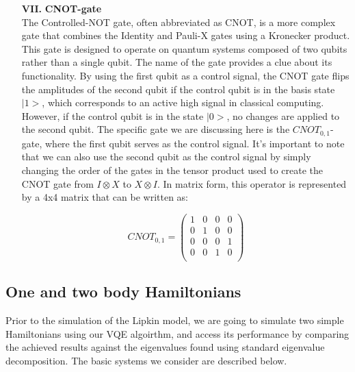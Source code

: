 \documentclass[onecolumn,10pt,cleanfoot]{asme2ej}
\begin{document}
\begin{enumerate}
	\item[\textbf{VII.}] \textbf{CNOT-gate} \\
		The Controlled-NOT gate, often abbreviated as CNOT, is a more complex gate that combines the Identity and Pauli-X gates using a Kronecker product. This gate is designed to operate on quantum systems composed of two qubits rather than a single qubit. The name of the gate provides a clue about its functionality. By using the first qubit as a control signal, the CNOT gate flips the amplitudes of the second qubit if the control qubit is in the basis state $|1>$, which corresponds to an active high signal in classical computing. However, if the control qubit is in the state $|0>$, no changes are applied to the second qubit. The specific gate we are discussing here is the $CNOT_{0,1}$-gate, where the first qubit serves as the control signal.
		It's important to note that we can also use the second qubit as the control signal by simply changing the order of the gates in the tensor product used to create the CNOT gate from $I \otimes X$ to $X \otimes I$. In matrix form, this operator is represented by a 4x4 matrix that can be written as:
		
		\begin{equation*}
		 CNOT_{0,1} = \begin{pmatrix}
			1 & 0 & 0 & 0 \\
			0 & 1 & 0 & 0 \\
			0 & 0 & 0 & 1 \\
			0 & 0 & 1 & 0 \\
		\end{pmatrix}
	\end{equation*}

\end{enumerate}

\subsection{One and two body Hamiltonians} 
Prior to the simulation of the Lipkin model, we are going to simulate two simple Hamiltonians using our VQE algoirthm, and access its performance by comparing the achieved results against the eigenvalues found using standard eigenvalue decomposition. The basic systems we consider are described below. 
\end{document}
